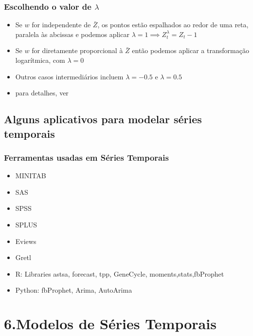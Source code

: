 \documentclass{beamer}
\begin{document}
	\begin{frame}
		\frametitle{Escolhendo o valor de $\lambda$}
		\begin{itemize}
			\item<1-> Se $w$ for independente de $\bar{Z}$, os pontos estão espalhados ao redor de uma reta, paralela às abcissas e podemos aplicar $\lambda=1 \implies Z_{t}^{\lambda} = Z_{t} -1 $
			
			\item<1-> Se $w$ for diretamente proporcional à $\bar{Z}$ então podemos aplicar a transformação logarítmica, com $\lambda = 0 $
			
			\item<1-> Outros casos intermediários incluem $\lambda = -0.5 $ e $\lambda = 0.5 $
			\item<1-> para detalhes, ver \cite{box1964analysis}
		\end{itemize}
	\end{frame}
	\subsection{Alguns aplicativos para modelar séries temporais}
	\begin{frame}
		\frametitle{Ferramentas usadas em Séries Temporais}
		\begin{itemize}
			\item<1->  MINITAB
			\item<1->  SAS
			\item<1->  SPSS
			\item<1->  SPLUS
			\item<1->  Eviews
			\item<1->  Gretl
			\item<1->  R: Libraries astsa, forecast\cite{hyndman2018forecasting}, tpp, GeneCycle, moments,stats,fbProphet
			\item<1->  Python: fbProphet, Arima, AutoArima\cite{morettin2018analise}
			
		\end{itemize}
		
	\end{frame}

	\section{6.Modelos de Séries Temporais}
\end{document}
